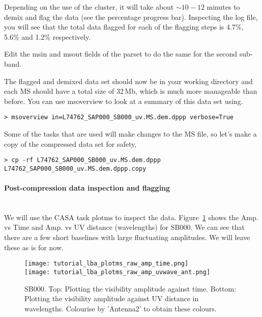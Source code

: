 Depending on the use of the cluster, it will take about $\sim10-12$ minutes to demix and flag the data (see the percentage progress bar). Inspecting the log file, you will see that the total data flagged for each of the flagging steps is 4.7\%, 5.6\% and 1.2\% respectively.

Edit the msin and msout fields of the parset to do the same for the second sub-band.

The flagged and demixed data set should now be in your working directory and each MS should have a total size of 32\,Mb, which is much more manageable than before. You can use msoverview to look at a summary of this data set using.
\begin{verbatim}
> msoverview in=L74762_SAP000_SB000_uv.MS.dem.dppp verbose=True
\end{verbatim}

Some of the tasks that are used will make changes to the MS file, so let's make a copy of the compressed data set for safety,
\begin{verbatim}
> cp -rf L74762_SAP000_SB000_uv.MS.dem.dppp L74762_SAP000_SB000_uv.MS.dem.dppp.copy
\end{verbatim}


\paragraph{Post-compression data inspection and flagging}\mbox{}\\

We will use the CASA task plotms to inspect the data. Figure~\ref{fig:plotms1_lba} shows the Amp. vs Time and Amp. vs UV distance (wavelengths) for SB000. We can see that there are a few short baselines with large fluctuating amplitudes. We will leave these as is for now.

\begin{figure}[htp]
\centering
 \texttt{[image: tutorial\_lba\_plotms\_raw\_amp\_time.png]}\\
 \texttt{[image: tutorial\_lba\_plotms\_raw\_amp\_uvwave\_ant.png]}
 \caption{SB000. Top: Plotting the visibility amplitude against time.  Bottom:
Plotting the visibility amplitude against UV distance in wavelengths. Colourise
by 'Antenna2' to obtain these colours.}
\label{fig:plotms1_lba}
\end{figure}







